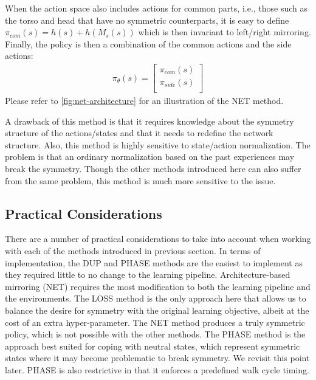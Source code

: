 When the action space also includes actions for common parts,
i.e., those such as the torso and head that have no symmetric counterparts,
it is easy to define $\pi_{com}(s) = h(s) + h(M_s(s))$ 
which is then invariant to left/right mirroring. 
Finally, the policy is then a combination of the common actions and the side actions:
\begin{align*}
    \pi_\theta(s) = \begin{bmatrix}
        \pi_{com}(s)\\
        \pi_{side}(s)\\
    \end{bmatrix}
\end{align*}
Please refer to \autoref{fig:net-architecture} for an illustration of the NET method.

A drawback of this method is that it requires knowledge about the symmetry structure of the actions/states 
and that it needs to redefine the network structure. 
Also, this method is highly sensitive to state/action normalization.
The problem is that an ordinary normalization based on the past experiences may break the symmetry.
Though the other methods introduced here can also suffer from the same problem, this method is much more sensitive to the issue.

\subsection{Practical Considerations}

There are a number of practical considerations to take into account when working with 
each of the methods introduced in previous section.
In terms of implementation, the DUP and PHASE methods are the easiest to 
implement as they required little to no change to the learning pipeline.  
Architecture-based mirroring (NET)
requires the most modification to both the learning pipeline and the environments.
The LOSS method is the only approach here that allows us to balance the desire for symmetry 
with the original learning objective, albeit at the cost of an extra hyper-parameter.  
The NET method produces a truly symmetric policy, which is not possible with the other methods.
The PHASE method is the approach best suited for coping with neutral states, 
which represent symmetric states where it may become problematic to break symmetry.
We revisit this point later.
PHASE is also restrictive in that it enforces a predefined walk cycle timing.


